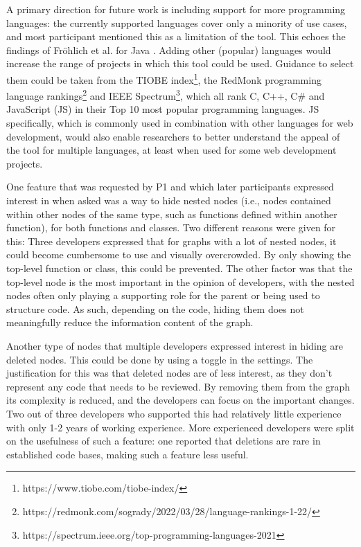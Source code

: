 \documentclass[a4paper,11pt,twoside]{article}
\theoremstyle{definition} %
\renewcommand{\cite}[1]{\citep{#1}}
\begin{document}
A primary direction for future work is including support for more programming languages: the currently supported languages cover only a minority of use cases, and most participant mentioned this as a limitation of the tool. This echoes the findings of Fröhlich et al. for Java \cite{cr_visualization_major}. Adding other (popular) languages would increase the range of projects in which this tool could be used. Guidance to select them could be taken from the TIOBE index\footnote{https://www.tiobe.com/tiobe-index/}, the RedMonk programming language rankings\footnote{https://redmonk.com/sogrady/2022/03/28/language-rankings-1-22/} and IEEE Spectrum\footnote{https://spectrum.ieee.org/top-programming-languages-2021}, which all rank C, C++, C\# and JavaScript (JS) in their Top 10 most popular programming languages. JS specifically, which is commonly used in combination with other languages for web development, would also enable researchers to better understand the appeal of the tool for multiple languages, at least when used for some web development projects.

One feature that was requested by P1 and which later participants expressed interest in when asked was a way to hide nested nodes (i.e., nodes contained within other nodes of the same type, such as functions defined within another function), for both functions and classes. Two different reasons were given for this: Three developers expressed that for graphs with a lot of nested nodes, it could become cumbersome to use and visually overcrowded. By only showing the top-level function or class, this could be prevented. The other factor was that the top-level node is the most important in the opinion of developers, with the nested nodes often only playing a supporting role for the parent or being used to structure code. As such, depending on the code, hiding them does not meaningfully reduce the information content of the graph. 

Another type of nodes that multiple developers expressed interest in hiding are deleted nodes. This could be done by using a toggle in the settings. The justification for this was that deleted nodes are of less interest, as they don’t represent any code that needs to be reviewed. By removing them from the graph its complexity is reduced, and the developers can focus on the important changes. Two out of three developers who supported this had relatively little experience with only 1-2 years of working experience. More experienced developers were split on the usefulness of such a feature: one reported that deletions are rare in established code bases, making such a feature less useful.
\end{document}
